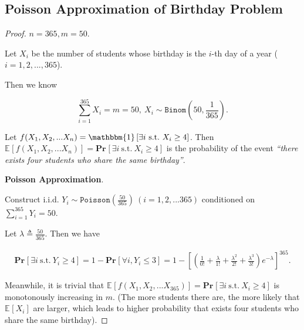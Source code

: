 \documentclass{article}
\renewcommand{\Pr}[2]{\mathbf{Pr}_{#1}\left[#2\right]}
\newcommand{\staExp}[2]{\mathbb{E}_{#1}\left[#2\right]}
\begin{document}
\subsection{Poisson Approximation of Birthday Problem}
\vspace{1em}
\begin{proof}
    $n=365, m=50.$

    \hspace{1.3em}
    Let $X_i$ be the number of students whose birthday is the $i$-th day of a year ($i=1,2,...,365$).
    
    \hspace{1.3em}
    Then we know 
    
    \vspace{-1.5em}
    $$\sum_{i=1}^{365}X_i=m=50,\ X_i\sim\mathtt{Binom}\left(50,\frac{1}{365}\right).$$
    
    \hspace{1.3em}
    Let $f(X_1,X_2,...X_n)=\mathbbm{1}\left[\exists i\ \mathrm{s.t.}\ X_i\geq4\right]$. Then $\staExp{}{f(X_1,X_2,...X_n)}=\Pr{}{\exists i\ \mathrm{s.t.}\ X_i\geq4}$ is the probability of the event \textit{“there exists four students who share the same birthday”}.
    
    \vspace{1.5em} \hspace{1.3em}
    \textbf{Poisson Approximation}. 
    
    \hspace{1.3em}
    Construct i.i.d. $Y_i\sim\mathtt{Poisson}\left(\frac{50}{365}\right)\ (i=1,2,...365)$ conditioned on $\sum_{i=1}^{365}Y_i=50$.
    
    \hspace{1.3em}
    Let $\lambda\triangleq\frac{50}{365}$. Then we have
    
    \vspace{-2.7em}
    \begin{align*}
        \Pr{}{\exists i\ \mathrm{s.t.}\ Y_i\geq4}=1-\Pr{}{\forall i, Y_i\le3} = 1-\left[\left(\frac{1}{0!}+\frac{\lambda}{1!}+\frac{\lambda^2}{2!}+\frac{\lambda^3}{3!}\right)e^{-\lambda}\right]^{365}.
    \end{align*}
    
    \vspace{0.5em} \hspace{1.3em}
    Meanwhile, it is trivial that $\staExp{}{f(X_1,X_2,...X_{365})}=\Pr{}{\exists i\ \mathrm{s.t.}\ X_i\geq4}$ is monotonously increasing in $m$. (The more students there are, the more likely that $\staExp{}{X_i}$ are larger, which leads to higher probability that exists four students who share the same birthday). 
    

\end{proof}
\end{document}
